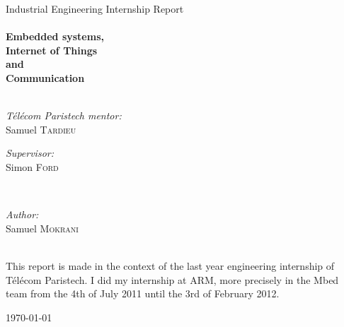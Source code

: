 \begin{titlepage}
\begin{center}
\LARGE Industrial Engineering Internship Report\\[0.5cm]
\HRule \\
{ \huge \bfseries Embedded systems, \\ Internet of Things \\ and \\ Communication}\\

\HRule \\[1cm]

\begin{minipage}{0.4\textwidth}
\begin{flushleft} \large
\emph{T\'{e}l\'{e}com Paristech mentor:}\\
Samuel \textsc{Tardieu}
\end{flushleft}
\end{minipage}
\begin{minipage}{0.4\textwidth}
\begin{flushright} \large
\emph{Supervisor:} \\
Simon \textsc{Ford}
\end{flushright}
\end{minipage}\\[1.0cm]


\begin{minipage}{0.4\textwidth}
\begin{center} \large
\emph{Author:} \\
Samuel \textsc{Mokrani}
\end{center}
\end{minipage}\\[3.0cm]

\large This report is made in the context of the last year engineering internship of T\'{e}l\'{e}com Paristech. I did my internship at ARM, more precisely in the Mbed team from the 4th of July 2011 until the 3rd of February 2012.



\vfill

{\large \today}

\end{center}

\end{titlepage}